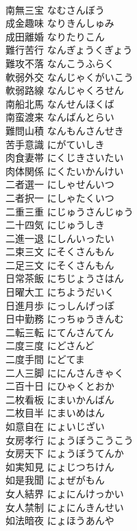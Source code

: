 \documentclass[8pt]{extreport}
\begin{document}
\begin{CJK}{UTF8}{min}
\\	南無三宝	なむさんぼう	
\\	成金趣味	なりきんしゅみ	
\\	成田離婚	なりたりこん	
\\	難行苦行	なんぎょうくぎょう	
\\	難攻不落	なんこうふらく	
\\	軟弱外交	なんじゃくがいこう	
\\	軟弱路線	なんじゃくろせん	
\\	南船北馬	なんせんほくば	
\\	南蛮渡来	なんばんとらい	
\\	難問山積	なんもんさんせき	
\\	苦手意識	にがていしき	
\\	肉食妻帯	にくじきさいたい	
\\	肉体関係	にくたいかんけい	
\\	二者選一	にしゃせんいつ	
\\	二者択一	にしゃたくいつ	
\\	二重三重	にじゅうさんじゅう	
\\	二十四気	にじゅうしき	
\\	二進一退	にしんいったい	
\\	二束三文	にそくさんもん	
\\	二足三文	にそくさんもん	
\\	日常茶飯	にちじょうさはん	
\\	日曜大工	にちようだいく	
\\	日進月歩	にっしんげっぽ	
\\	日中勤務	にっちゅうきんむ	
\\	二転三転	にてんさんてん	
\\	二度三度	にどさんど	
\\	二度手間	にどてま	
\\	二人三脚	ににんさんきゃく	
\\	二百十日	にひゃくとおか	
\\	二枚看板	にまいかんばん	
\\	二枚目半	にまいめはん	
\\	如意自在	にょいじざい	
\\	女房孝行	にょうぼうこうこう	
\\	女房天下	にょうぼうてんか	
\\	如実知見	にょじつちけん	
\\	如是我聞	にょぜがもん	
\\	女人結界	にょにんけっかい	
\\	女人禁制	にょにんきんせい	
\\	如法暗夜	にょほうあんや	

\end{CJK}
\end{document}
